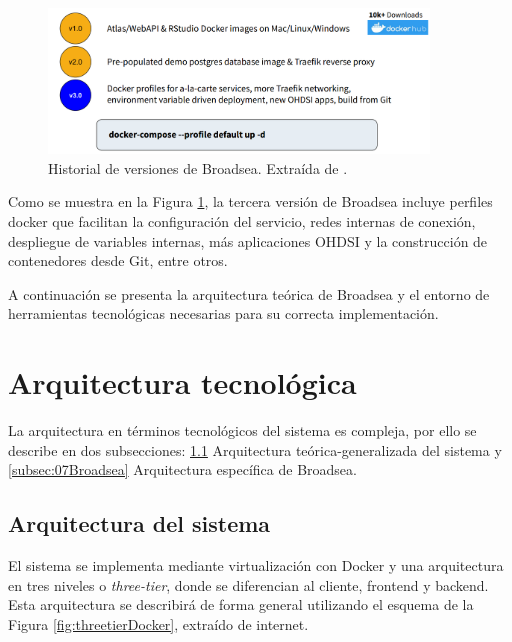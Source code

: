 \begin{figure}[H]
    \centering
    \includegraphics[width=0.90\textwidth]{figures/versionesBroadsea.png}
    \caption{Historial de versiones de Broadsea. Extraída de \cite{Broadsea3PPTX}.}
    \label{fig:versionesBroadsea}
\end{figure}

Como se muestra en la Figura \ref{fig:versionesBroadsea}, la tercera versión de Broadsea incluye perfiles docker que facilitan la configuración del servicio, redes internas de conexión, despliegue de variables internas, más aplicaciones OHDSI y la construcción de contenedores desde Git, entre otros. 

A continuación se presenta la arquitectura teórica de Broadsea y el entorno de herramientas tecnológicas necesarias para su correcta implementación.

\section{Arquitectura tecnológica} \label{sec:07arqTecno}

La arquitectura en términos tecnológicos del sistema es compleja, por ello se describe en dos subsecciones: \ref{subsec:07sistema} Arquitectura teórica-generalizada del sistema y \ref{subsec:07Broadsea} Arquitectura específica de Broadsea.

\subsection{Arquitectura del sistema}\label{subsec:07sistema}

El sistema se implementa mediante virtualización con Docker y una arquitectura en tres niveles o \textit{three-tier}, donde se diferencian al cliente, frontend y backend. Esta arquitectura se describirá de forma general utilizando el esquema de la Figura \ref{fig:threetierDocker}, extraído de internet.

